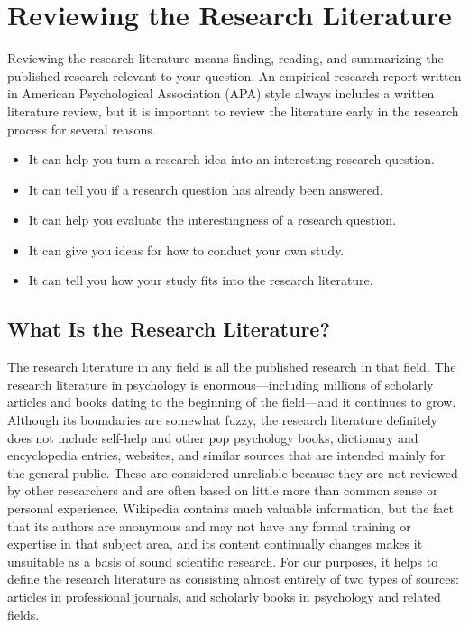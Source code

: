 \newpage
\section{Reviewing the Research Literature}


Reviewing the research literature means finding, reading, and summarizing the published research relevant to your question. An empirical research report written in American Psychological Association (APA) style always includes a written literature review, but it is important to review the literature early in the research process for several reasons.

\begin{itemize}
\item It can help you turn a research idea into an interesting research question.
\item It can tell you if a research question has already been answered.
\item It can help you evaluate the interestingness of a research question.
\item It can give you ideas for how to conduct your own study.
\item It can tell you how your study fits into the research literature.
\end{itemize}

\subsection{What Is the Research Literature?}

The research literature in any field is all the published research in that field. The research literature in psychology is enormous---including millions of scholarly articles and books dating to the beginning of the field---and it continues to grow. Although its boundaries are somewhat fuzzy, the research literature definitely does not include self-help and other pop psychology books, dictionary and encyclopedia entries, websites, and similar sources that are intended mainly for the general public. These are considered unreliable because they are not reviewed by other researchers and are often based on little more than common sense or personal experience. Wikipedia contains much valuable information, but the fact that its authors are anonymous and may not have any formal training or expertise in that subject area, and its content continually changes makes it unsuitable as a basis of sound scientific research. For our purposes, it helps to define the research literature as consisting almost entirely of two types of sources: articles in professional journals, and scholarly books in psychology and related fields.

